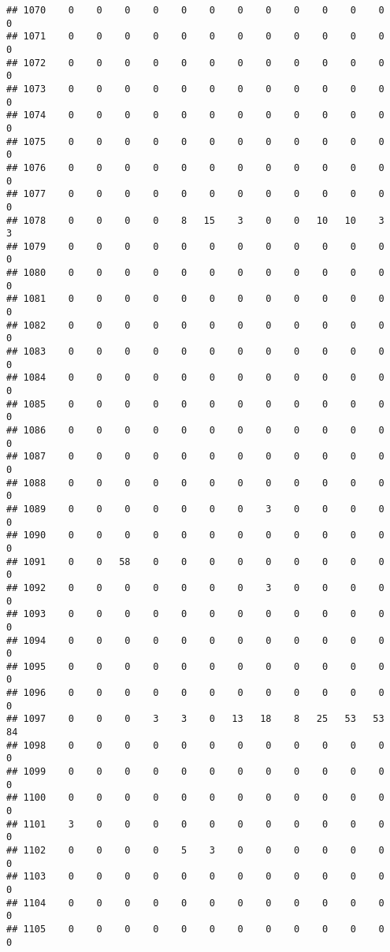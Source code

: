 \documentclass[]{article}
\begin{document}
\begin{verbatim}
## 1070    0    0    0    0    0    0    0    0    0    0    0    0    0
## 1071    0    0    0    0    0    0    0    0    0    0    0    0    0
## 1072    0    0    0    0    0    0    0    0    0    0    0    0    0
## 1073    0    0    0    0    0    0    0    0    0    0    0    0    0
## 1074    0    0    0    0    0    0    0    0    0    0    0    0    0
## 1075    0    0    0    0    0    0    0    0    0    0    0    0    0
## 1076    0    0    0    0    0    0    0    0    0    0    0    0    0
## 1077    0    0    0    0    0    0    0    0    0    0    0    0    0
## 1078    0    0    0    0    8   15    3    0    0   10   10    3    3
## 1079    0    0    0    0    0    0    0    0    0    0    0    0    0
## 1080    0    0    0    0    0    0    0    0    0    0    0    0    0
## 1081    0    0    0    0    0    0    0    0    0    0    0    0    0
## 1082    0    0    0    0    0    0    0    0    0    0    0    0    0
## 1083    0    0    0    0    0    0    0    0    0    0    0    0    0
## 1084    0    0    0    0    0    0    0    0    0    0    0    0    0
## 1085    0    0    0    0    0    0    0    0    0    0    0    0    0
## 1086    0    0    0    0    0    0    0    0    0    0    0    0    0
## 1087    0    0    0    0    0    0    0    0    0    0    0    0    0
## 1088    0    0    0    0    0    0    0    0    0    0    0    0    0
## 1089    0    0    0    0    0    0    0    3    0    0    0    0    0
## 1090    0    0    0    0    0    0    0    0    0    0    0    0    0
## 1091    0    0   58    0    0    0    0    0    0    0    0    0    0
## 1092    0    0    0    0    0    0    0    3    0    0    0    0    0
## 1093    0    0    0    0    0    0    0    0    0    0    0    0    0
## 1094    0    0    0    0    0    0    0    0    0    0    0    0    0
## 1095    0    0    0    0    0    0    0    0    0    0    0    0    0
## 1096    0    0    0    0    0    0    0    0    0    0    0    0    0
## 1097    0    0    0    3    3    0   13   18    8   25   53   53   84
## 1098    0    0    0    0    0    0    0    0    0    0    0    0    0
## 1099    0    0    0    0    0    0    0    0    0    0    0    0    0
## 1100    0    0    0    0    0    0    0    0    0    0    0    0    0
## 1101    3    0    0    0    0    0    0    0    0    0    0    0    0
## 1102    0    0    0    0    5    3    0    0    0    0    0    0    0
## 1103    0    0    0    0    0    0    0    0    0    0    0    0    0
## 1104    0    0    0    0    0    0    0    0    0    0    0    0    0
## 1105    0    0    0    0    0    0    0    0    0    0    0    0    0

\end{verbatim}
\end{document}
